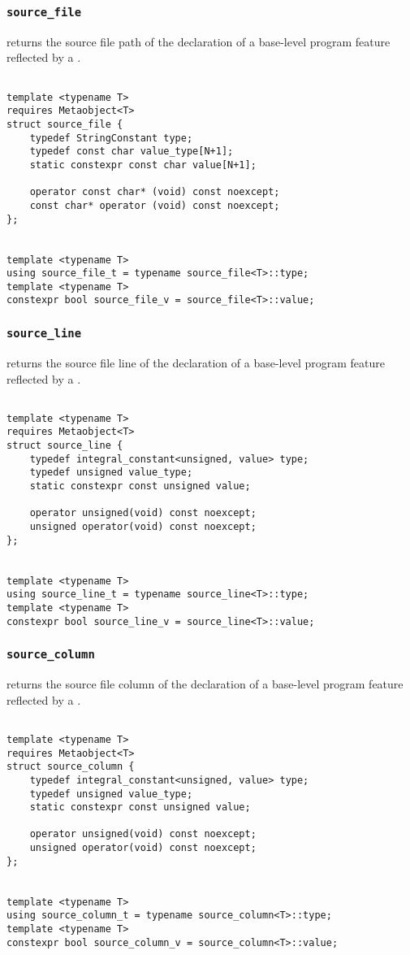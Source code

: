 
\subsubsection{\texttt{source\_file}}

returns the source file path of the declaration of a base-level program feature reflected by a .

\begin{verbatim}

template <typename T>
requires Metaobject<T>
struct source_file {
	typedef StringConstant type;
	typedef const char value_type[N+1];
	static constexpr const char value[N+1];

	operator const char* (void) const noexcept;
	const char* operator (void) const noexcept;
};


template <typename T>
using source_file_t = typename source_file<T>::type;
template <typename T>
constexpr bool source_file_v = source_file<T>::value;

\end{verbatim}

\subsubsection{\texttt{source\_line}}

returns the source file line of the declaration of a base-level program feature reflected by a .

\begin{verbatim}

template <typename T>
requires Metaobject<T>
struct source_line {
	typedef integral_constant<unsigned, value> type;
	typedef unsigned value_type;
	static constexpr const unsigned value;

	operator unsigned(void) const noexcept;
	unsigned operator(void) const noexcept;
};


template <typename T>
using source_line_t = typename source_line<T>::type;
template <typename T>
constexpr bool source_line_v = source_line<T>::value;

\end{verbatim}

\subsubsection{\texttt{source\_column}}

returns the source file column of the declaration of a base-level program feature reflected by a .

\begin{verbatim}

template <typename T>
requires Metaobject<T>
struct source_column {
	typedef integral_constant<unsigned, value> type;
	typedef unsigned value_type;
	static constexpr const unsigned value;

	operator unsigned(void) const noexcept;
	unsigned operator(void) const noexcept;
};


template <typename T>
using source_column_t = typename source_column<T>::type;
template <typename T>
constexpr bool source_column_v = source_column<T>::value;

\end{verbatim}

